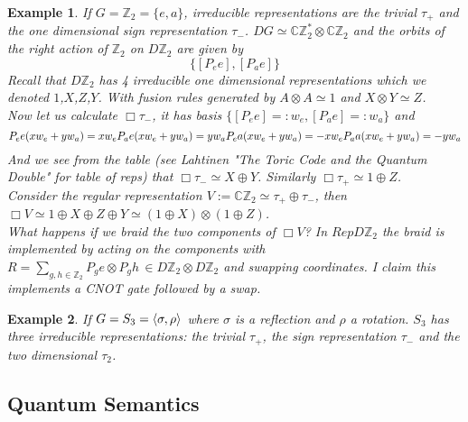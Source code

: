 \documentclass{article}
\newtheorem{example}{Example}
\begin{document}
\begin{example}
If $G=\mathbb{Z}_2= \{e,a\}$, irreducible representations are the trivial $\tau_+$ and the one dimensional sign representation $\tau_-$. $DG \simeq \mathbb{C}\mathbb{Z}_2^* \otimes \mathbb{C}\mathbb{Z}_2$ and the orbits of the right action of $\mathbb{Z}_2$ on $D\mathbb{Z}_2$ are given by
$$ \{ [P_ee], [P_ae] \}$$
Recall that $D\mathbb{Z}_2$ has 4 irreducible one dimensional representations which we denoted $1$,$X$,$Z$,$Y$. With fusion rules generated by $A \otimes A \simeq 1$ and $X \otimes Y \simeq Z$. \\
Now let us calculate $\Box \tau_-$, it has basis $\{[P_ee] =:w_e, [P_ae] =:w_a \}$ and 
\begin{equation*}
P_ee(xw_e + yw_a)= xw_e \\
P_ae(xw_e + yw_a)= yw_a \\
P_ea(xw_e + yw_a)= -xw_e \\ 
P_aa(xw_e + yw_a)= -yw_a
\end{equation*}
And we see from the table (see Lahtinen "The Toric Code and the Quantum Double" for table of reps) that $\Box \tau_- \simeq X \oplus Y$. Similarly $\Box \tau_+ \simeq 1 \oplus Z$. \\
Consider the regular representation $V := \mathbb{C}\mathbb{Z}_2 \simeq \tau_+ \oplus \tau_-$, then $\Box V \simeq 1 \oplus X \oplus Z \oplus Y \simeq (1 \oplus X) \otimes (1 \oplus Z) $.\\
What happens if we braid the two components of $\Box V$? In $RepD\mathbb{Z}_2$ the braid is implemented by acting on the components with $R=\sum_{g,h\in\mathbb{Z}_2} P_ge \otimes P_gh \, \in D\mathbb{Z}_2\otimes D\mathbb{Z}_2$ and swapping coordinates. I claim this implements a CNOT gate followed by a swap.
\end{example}

\begin{example}
If $G=S_3=\braket{\sigma,\rho}$ where $\sigma$ is a reflection and $\rho$ a rotation. $S_3$ has three irreducible representations: the trivial $\tau_+$, the sign representation $\tau_-$ and the two dimensional $\tau_2$.
\end{example}



\subsection{Quantum Semantics}




\end{document}
